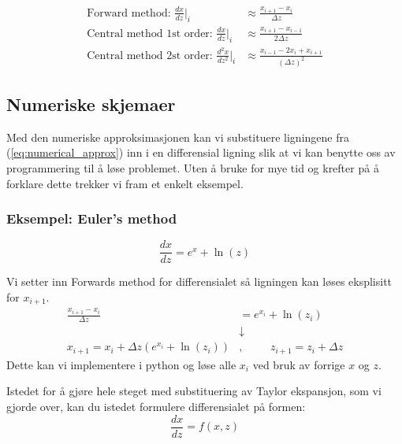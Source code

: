 \begin{equation}
    \begin{split}
    \label{eq:numerical_approx}        
    \text{Forward method: }\frac{dx}{dz}\Big|_i &\approx \frac{x_{i+1}-x_i}{\Delta z} \\
    \text{Central method 1st order: }\frac{dx}{dz}\Big|_i &\approx \frac{x_{i+1}-x_{i-1}}{2\Delta z}\\
    \text{Central method 2st order: }\frac{d^2x}{dz^2}\Big|_i &\approx \frac{x_{i-1}-2x_i+x_{i+1}}{(\Delta z)^2}
    \end{split}
\end{equation}
    

\subsection{Numeriske skjemaer}
Med den numeriske approksimasjonen kan vi substituere ligningene fra (\ref{eq:numerical_approx}) inn i en differensial ligning slik at vi kan benytte oss av programmering til å løse problemet. Uten å bruke for mye tid og krefter på å forklare dette trekker vi fram et enkelt eksempel.

\subsubsection{Eksempel: Euler's method}\label{sec:euler_numerical}

\begin{equation}
    \frac{dx}{dz} = e^x + \ln (z)  
\end{equation}

Vi setter inn Forwards method for differensialet så ligningen kan løses eksplisitt for $x_{i+1}$.
\begin{align}
    \frac{x_{i+1}-x_i}{\Delta z} &= e^{x_i} + \ln (z_i)  \\
    &\downarrow \\
    \label{eq:eulers_methdo_example}
    x_{i+1} = x_i +\Delta z(e^{x_i} + \ln (z_i))&, \hspace{1cm} z_{i+1} = z_i + \Delta z
\end{align}
Dette kan vi implementere i python og løse alle $x_i$ ved bruk av forrige $x$ og $z$.

Istedet for å gjøre hele steget med substituering av Taylor ekspansjon, som vi gjorde over, kan du istedet formulere differensialet på formen:
\begin{equation}
     \frac{dx}{dz} = f(x,z)
\end{equation}

